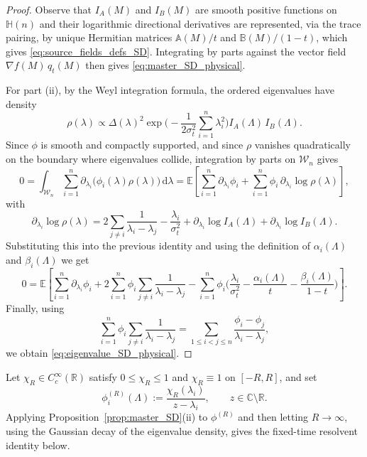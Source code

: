 \documentclass[11pt,a4paper]{article}
\theoremstyle{definition}\newtheorem{definition}[theorem]{Definition}
\theoremstyle{remark}\newtheorem{remark}[theorem]{Remark}
\numberwithin{equation}{section}
\newcommand{\R}{\mathbb{R}}
\newcommand{\C}{\mathbb{C}}
\newcommand{\dd}{\mathrm{d}}
\newcommand{\HH}{\mathbb{H}(n)}
\newcommand{\EE}{\mathbb{E}}
\begin{document}
\begin{proof}
  Observe that $I_A(M)$ and
$I_B(M)$ are smooth positive functions on $\HH$ and their logarithmic directional derivatives are represented, via the trace pairing, by unique Hermitian matrices $\mathbb A(M)/t$ and $\mathbb B(M)/(1-t)$, which gives \eqref{eq:source_fields_defs_SD}. Integrating by parts against the vector field $\nabla f(M)\,q_t(M)$ then gives \eqref{eq:master_SD_physical}.

For part \textup{(ii)}, by the Weyl integration formula, the
 ordered eigenvalues  have  density
\begin{equation}
\rho(\lambda)
\propto
\Delta(\lambda)^2
\exp\!\Big(-\frac1{2\sigma_t^2}\sum_{i=1}^n \lambda_i^2\Big)
I_A(\Lambda)\,I_B(\Lambda).
\end{equation}
Since $\phi$ is smooth and compactly supported, and since $\rho$ vanishes
quadratically on the boundary where eigenvalues collide,
integration by parts on $\mathcal W_n$ gives
\begin{equation}
0
=
\int_{\mathcal W_n}
\sum_{i=1}^n
\partial_{\lambda_i}\!\big(\phi_i(\lambda)\rho(\lambda)\big)\,\dd\lambda=\EE\!\left[
\sum_{i=1}^n \partial_{\lambda_i}\phi_i
+
\sum_{i=1}^n \phi_i\,\partial_{\lambda_i}\log\rho(\lambda)
\right],
\end{equation}
with
\begin{equation}
\partial_{\lambda_i}\log\rho(\lambda)
=
2\sum_{j\ne i}\frac1{\lambda_i-\lambda_j}
-\frac{\lambda_i}{\sigma_t^2}
+\partial_{\lambda_i}\log I_A(\Lambda)
+\partial_{\lambda_i}\log I_B(\Lambda).
\end{equation}
Substituting this into the previous identity and using the definition of $\alpha_i(\Lambda)$ and $\beta_i(\Lambda)$ we get
\begin{equation}0= \EE\!\left[ \sum_{i=1}^n \partial_{\lambda_i}\phi_i+2\sum_{i=1}^n \phi_i\sum_{j\ne i}\frac1{\lambda_i-\lambda_j}-\sum_{i=1}^n \phi_i\Big( \frac{\lambda_i}{\sigma_t^2} -\frac{\alpha_i(\Lambda)}{t} -\frac{\beta_i(\Lambda)}{1-t} \Big) \right].
\end{equation}
Finally, using
\begin{equation}
\sum_{i=1}^n \phi_i\sum_{j\ne i}\frac1{\lambda_i-\lambda_j}
=
\sum_{1\le i<j\le n}\frac{\phi_i-\phi_j}{\lambda_i-\lambda_j},
\end{equation}
we obtain \eqref{eq:eigenvalue_SD_physical}.
\end{proof}


Let $\chi_R\in C_c^\infty(\R)$ satisfy $0\le \chi_R\le 1$ and $\chi_R\equiv 1$ on $[-R,R]$, and set
\begin{equation}
\phi_i^{(R)}(\Lambda):=\frac{\chi_R(\lambda_i)}{z-\lambda_i},
\qquad z\in\C\setminus\R.
\end{equation}
Applying Proposition~\ref{prop:master_SD}\textup{(ii)} to $\phi^{(R)}$ and then letting $R\to\infty$, using the Gaussian decay of the eigenvalue density, gives the fixed-time resolvent identity below.
\end{document}
